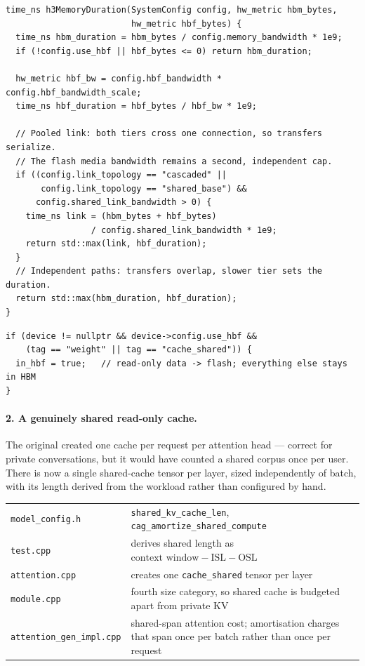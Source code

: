 \documentclass[11pt,a4paper]{article}
\newcommand{\code}[1]{\texttt{#1}}
\begin{document}
\begin{lstlisting}[caption={\code{layer\_impl.cpp} --- the whole two-tier cost model},captionpos=b]
time_ns h3MemoryDuration(SystemConfig config, hw_metric hbm_bytes,
                         hw_metric hbf_bytes) {
  time_ns hbm_duration = hbm_bytes / config.memory_bandwidth * 1e9;
  if (!config.use_hbf || hbf_bytes <= 0) return hbm_duration;

  hw_metric hbf_bw = config.hbf_bandwidth * config.hbf_bandwidth_scale;
  time_ns hbf_duration = hbf_bytes / hbf_bw * 1e9;

  // Pooled link: both tiers cross one connection, so transfers serialize.
  // The flash media bandwidth remains a second, independent cap.
  if ((config.link_topology == "cascaded" ||
       config.link_topology == "shared_base") &&
      config.shared_link_bandwidth > 0) {
    time_ns link = (hbm_bytes + hbf_bytes)
                 / config.shared_link_bandwidth * 1e9;
    return std::max(link, hbf_duration);
  }
  // Independent paths: transfers overlap, slower tier sets the duration.
  return std::max(hbm_duration, hbf_duration);
}
\end{lstlisting}

\begin{lstlisting}[caption={\code{tensor.cpp} --- placement follows the tag, so no call site decides},captionpos=b]
if (device != nullptr && device->config.use_hbf &&
    (tag == "weight" || tag == "cache_shared")) {
  in_hbf = true;   // read-only data -> flash; everything else stays in HBM
}
\end{lstlisting}

\paragraph{2. A genuinely shared read-only cache.}
The original created one cache per request per attention head --- correct for
private conversations, but it would have counted a shared corpus once per user.
There is now a single shared-cache tensor per layer, sized independently of
batch, with its length derived from the workload rather than configured by hand.

\begin{center}\small
\begin{tabular}{@{}p{5.0cm}p{9.3cm}@{}}
\toprule
\code{model\_config.h} & \code{shared\_kv\_cache\_len},
  \code{cag\_amortize\_shared\_compute} \\
\code{test.cpp} & derives shared length as
  $\text{context window} - \text{ISL} - \text{OSL}$ \\
\code{attention.cpp} & creates one \code{cache\_shared} tensor per layer \\
\code{module.cpp} & fourth size category, so shared cache is budgeted apart
  from private KV \\
\code{attention\_gen\_impl.cpp} & shared-span attention cost; amortisation
  charges that span once per batch rather than once per request \\
\bottomrule
\end{tabular}
\end{center}
\end{document}
